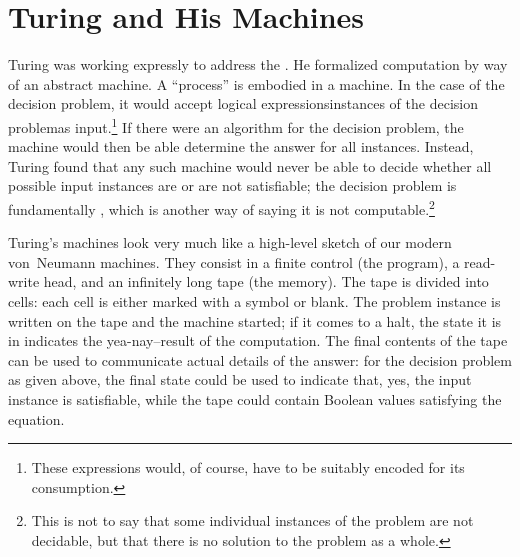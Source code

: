 \section{Turing and His Machines}
Turing was working expressly to address the . He formalized computation by way of an abstract machine. A ``process'' is embodied in a machine. In the case of the decision problem, it would accept logical expressions\empause instances of the decision problem\empause as input.\footnote{These expressions would, of course, have to be suitably encoded for its consumption.} If there were an algorithm for the decision problem, the machine would then be able determine the answer for all instances. Instead, Turing found that any such machine would never be able to decide whether all possible input instances are or are not satisfiable; the decision problem is fundamentally , which is another way of saying it is not computable.\footnote{This is not to say that some individual instances of the problem are not decidable, but that there is no solution to the problem as a whole.}

Turing's machines look very much like a high-level sketch of our modern von~Neumann machines. They consist in a finite control (the program), a read-write head, and an infinitely long tape (the memory). The tape is divided into cells: each cell is either marked with a symbol or blank. The problem instance is written on the tape and the machine started; if it comes to a halt, the state it is in indicates the yea-nay--result of the computation. The final contents of the tape can be used to communicate actual details of the answer: for the decision problem as given above, the final state could be used to indicate that, yes, the input instance is satisfiable, while the tape could contain Boolean values satisfying the equation.

